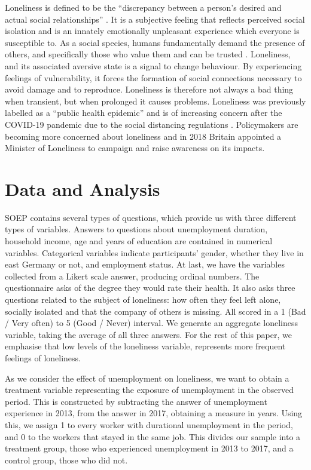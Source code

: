 \documentclass[11pt, a4paper, leqno]{article}
\begin{document}
Loneliness is defined to be the “discrepancy between a person’s desired and actual social relationships” \citep{masi2011meta}. It is a subjective feeling that reflects perceived social isolation and is an innately emotionally unpleasant experience which everyone is susceptible to. As a social species, humans fundamentally demand the presence of others, and specifically those who value them and can be trusted \citep{cacioppo2008loneliness}. Loneliness, and its associated aversive state is a signal to change behaviour. By experiencing feelings of vulnerability, it forces the formation of social connections necessary to avoid damage and to reproduce. Loneliness is therefore not always a bad thing when transient, but when prolonged it causes problems. Loneliness was previously labelled as a “public health epidemic” \citep{rimmer2018rcgp} and is of increasing concern after the COVID-19 pandemic due to the social distancing regulations \citep{Payne_2021}. Policymakers are becoming more concerned about loneliness and in 2018 Britain appointed a Minister of Loneliness to campaign and raise awareness on its impacts.

\section{Data and Analysis} %
\label{sec: Data and Analysis}

SOEP contains several types of questions, which provide us with three different types of variables. Answers to questions about unemployment duration, household income, age and years of education are contained in numerical variables. Categorical variables indicate participants’ gender, whether they live in east Germany or not, and employment status. At last, we have the variables collected from a Likert scale answer, producing ordinal numbers. The questionnaire asks of the degree they would rate their health. It also asks three questions related to the subject of loneliness: how often they feel left alone, socially isolated and that the company of others is missing. All scored in a 1 (Bad / Very often) to 5 (Good / Never) interval. We generate an aggregate loneliness variable, taking the average of all three answers. For the rest of this paper, we emphasise that low levels of the loneliness variable, represents more frequent feelings of loneliness.

As we consider the effect of unemployment on loneliness, we want to obtain a treatment variable representing the exposure of unemployment in the observed period. This is constructed by subtracting the answer of unemployment experience in 2013, from the answer in 2017, obtaining a measure in years. Using this, we assign 1 to every worker with durational unemployment in the period, and 0 to the workers that stayed in the same job. This divides our sample into a treatment group, those who experienced unemployment in 2013 to 2017, and a control group, those who did not.
\end{document}
